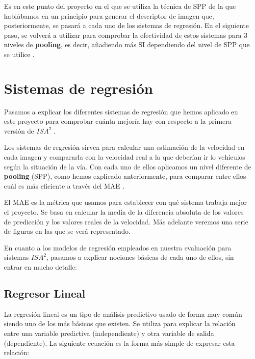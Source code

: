 Es en este punto del proyecto en el que se utiliza la técnica de \ac{SPP} \cite{spp} de la que hablábamos en un principio para generar el descriptor de imagen que, posteriormente, se pasará a cada uno de los sistemas de regresión. En el siguiente paso, se volverá a utilizar para comprobar la efectividad de estos sistemas para 3 niveles de \textbf{pooling}, es decir, añadiendo más \ac{SI} dependiendo del nivel de \ac{SPP} que se utilice \cite{isa2}.

\section{Sistemas de regresión}

Pasamos a explicar los diferentes sistemas de regresión que hemos aplicado en este proyecto para comprobar cuánta mejoría hay con respecto a la primera versión de $ISA^{2}$ \cite{isa2}.

Los sistemas de regresión sirven para calcular una estimación de la velocidad en cada imagen y compararla con la velocidad real a la que deberían ir lo vehículos según la situación de la vía. Con cada uno de ellos aplicamos un nivel diferente de \textbf{pooling} (\ac{SPP}), como hemos explicado anteriormente, para comparar entre ellos cuál es más eficiente a través del \ac{MAE} \cite{mae}.
 
El \ac{MAE} es la métrica que usamos para establecer con qué sistema trabaja mejor el proyecto. Se basa en calcular la media de la diferencia absoluta de los valores de predicción y los valores reales de la velocidad. Más adelante veremos una serie de figuras en las que se verá representado.

En cuanto a los modelos de regresión empleados en nuestra evaluación para sistemas $ISA^2$, pasamos a explicar nociones básicas de cada uno de ellos, sin entrar en mucho detalle:
\subsection{Regresor Lineal}

La regresión lineal \cite{linear} es un tipo de análisis predictivo usado de forma muy común siendo uno de los más básicos que existen. Se utiliza para explicar la relación entre una variable predictiva (independiente) y otra variable de salida (dependiente). La siguiente ecuación es la forma más simple de expresar esta relación:

